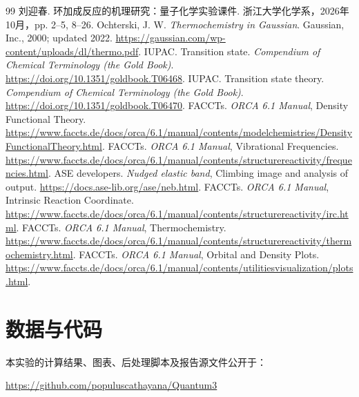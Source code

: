 \documentclass[a4paper,12pt]{article}
\begin{document}
\begin{thebibliography}{99}
 刘迎春. 环加成反应的机理研究：量子化学实验课件. 浙江大学化学系，2026年10月，pp. 2--5, 8--26.
 Ochterski, J. W. \textit{Thermochemistry in Gaussian}. Gaussian, Inc., 2000; updated 2022. \url{https://gaussian.com/wp-content/uploads/dl/thermo.pdf}.
 IUPAC. Transition state. \textit{Compendium of Chemical Terminology (the Gold Book)}. \url{https://doi.org/10.1351/goldbook.T06468}.
 IUPAC. Transition state theory. \textit{Compendium of Chemical Terminology (the Gold Book)}. \url{https://doi.org/10.1351/goldbook.T06470}.
 FACCTs. \textit{ORCA 6.1 Manual}, Density Functional Theory. \url{https://www.faccts.de/docs/orca/6.1/manual/contents/modelchemistries/DensityFunctionalTheory.html}.
 FACCTs. \textit{ORCA 6.1 Manual}, Vibrational Frequencies. \url{https://www.faccts.de/docs/orca/6.1/manual/contents/structurereactivity/frequencies.html}.
 ASE developers. \textit{Nudged elastic band}, Climbing image and analysis of output. \url{https://docs.ase-lib.org/ase/neb.html}.
 FACCTs. \textit{ORCA 6.1 Manual}, Intrinsic Reaction Coordinate. \url{https://www.faccts.de/docs/orca/6.1/manual/contents/structurereactivity/irc.html}.
 FACCTs. \textit{ORCA 6.1 Manual}, Thermochemistry. \url{https://www.faccts.de/docs/orca/6.1/manual/contents/structurereactivity/thermochemistry.html}.
 FACCTs. \textit{ORCA 6.1 Manual}, Orbital and Density Plots. \url{https://www.faccts.de/docs/orca/6.1/manual/contents/utilitiesvisualization/plots.html}.
\end{thebibliography}
\section*{数据与代码}
本实验的计算结果、图表、后处理脚本及报告源文件公开于：

\noindent\url{https://github.com/populuscathayana/Quantum3}
\end{document}
